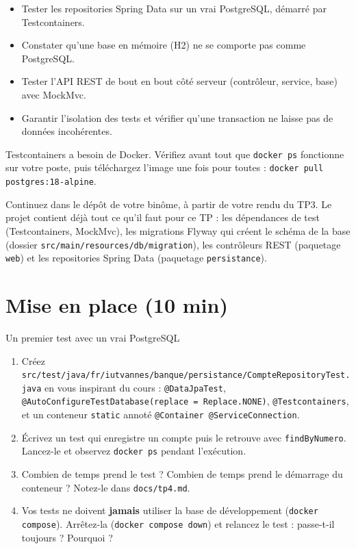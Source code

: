 \documentclass[11pt]{article}
\begin{document}

\begin{infobox}[Objectifs]
\begin{itemize}[leftmargin=1.2em, itemsep=1pt]
  \item Tester les repositories Spring Data sur un vrai PostgreSQL, démarré par Testcontainers.
  \item Constater qu'une base en mémoire (H2) ne se comporte pas comme PostgreSQL.
  \item Tester l'API REST de bout en bout côté serveur (contrôleur, service, base) avec MockMvc.
  \item Garantir l'isolation des tests et vérifier qu'une transaction ne laisse pas de données incohérentes.
\end{itemize}
\end{infobox}

\begin{infobox}
Testcontainers a besoin de Docker. Vérifiez avant tout que \texttt{docker ps} fonctionne sur votre poste, puis téléchargez l'image une fois pour toutes : \texttt{docker pull postgres:18-alpine}.
\end{infobox}

Continuez dans le dépôt de votre binôme, à partir de votre rendu du TP3. Le projet contient déjà tout ce qu'il faut pour ce TP : les dépendances de test (Testcontainers, MockMvc), les migrations Flyway qui créent le schéma de la base (dossier \texttt{src/main/resources/db/migration}), les contrôleurs REST (paquetage \texttt{web}) et les repositories Spring Data (paquetage \texttt{persistance}).

\section{Mise en place (10 min)}

\begin{exobox}{Un premier test avec un vrai PostgreSQL}
\begin{enumerate}[leftmargin=1.4em]
  \item Créez \texttt{src/test/java/fr/iutvannes/banque/persistance/CompteRepositoryTest.java} en vous inspirant du cours : \texttt{@DataJpaTest}, \texttt{@AutoConfigureTestDatabase(replace = Replace.NONE)}, \texttt{@Testcontainers}, et un conteneur \texttt{static} annoté \texttt{@Container @ServiceConnection}.
  \item Écrivez un test qui enregistre un compte puis le retrouve avec \texttt{findByNumero}. Lancez-le et observez \texttt{docker ps} pendant l'exécution.
  \item Combien de temps prend le test ? Combien de temps prend le démarrage du conteneur ? Notez-le dans \texttt{docs/tp4.md}.
  \item Vos tests ne doivent \textbf{jamais} utiliser la base de développement (\texttt{docker compose}). Arrêtez-la (\texttt{docker compose down}) et relancez le test : passe-t-il toujours ? Pourquoi ?
\end{enumerate}
\end{exobox}
\end{document}
